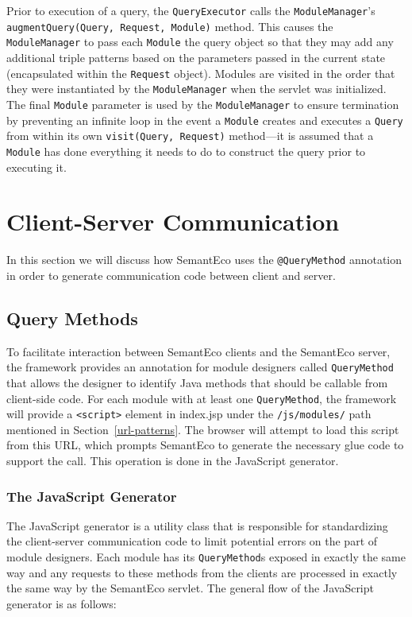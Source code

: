 \documentclass[letterpaper]{report}
\begin{document}
Prior to execution of a query, the \texttt{QueryExecutor} calls the \texttt{ModuleManager}'s \texttt{augmentQuery(Query, Request, Module)} method. This causes the \texttt{ModuleManager} to pass each \texttt{Module} the query object so that they may add any additional triple patterns based on the parameters passed in the current state (encapsulated within the \texttt{Request} object). Modules are visited in the order that they were instantiated by the \texttt{ModuleManager} when the servlet was initialized. The final \texttt{Module} parameter is used by the \texttt{ModuleManager} to ensure termination by preventing an infinite loop in the event a \texttt{Module} creates and executes a \texttt{Query} from within its own \texttt{visit(Query, Request)} method---it is assumed that a \texttt{Module} has done everything it needs to do to construct the query prior to executing it.

\section{Client-Server Communication}
\label{client-server-comm}
In this section we will discuss how SemantEco uses the \texttt{@QueryMethod} annotation in order to generate communication code between client and server. 

\subsection{Query Methods}
To facilitate interaction between SemantEco clients and the SemantEco server, the framework provides an annotation for module designers called \texttt{QueryMethod} that allows the designer to identify Java methods that should be callable from client-side code. For each module with at least one \texttt{QueryMethod}, the framework will provide a \texttt{<script>} element in index.jsp under the \texttt{/js/modules/} path mentioned in Section~\ref{url-patterns}. The browser will attempt to load this script from this URL, which prompts SemantEco to generate the necessary glue code to support the call. This operation is done in the JavaScript generator.

\subsubsection{The JavaScript Generator}
The JavaScript generator is a utility class that is responsible for standardizing the client-server communication code to limit potential errors on the part of module designers. Each module has its \texttt{QueryMethod}s exposed in exactly the same way and any requests to these methods from the clients are processed in exactly the same way by the SemantEco servlet. The general flow of the JavaScript generator is as follows:
\end{document}
